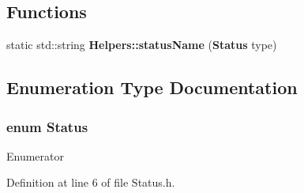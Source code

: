 \subsection*{Functions}
\begin{DoxyCompactItemize}
\item 
static std\+::string {\bf Helpers\+::status\+Name} ({\bf Status} type)
\end{DoxyCompactItemize}


\subsection{Enumeration Type Documentation}
\subsubsection[{Status}]{\setlength{\rightskip}{0pt plus 5cm}enum {\bf Status}\hspace{0.3cm}{\ttfamily [strong]}}\label{_status_8h_a67a0db04d321a74b7e7fcfd3f1a3f70b}
\begin{Desc}
\item[Enumerator]\par
\begin{description}
\item[{\em 
Moving\label{_status_8h_a67a0db04d321a74b7e7fcfd3f1a3f70badefe967ad0373b2274fc298f19125ca7}
}]\item[{\em 
Stopped\label{_status_8h_a67a0db04d321a74b7e7fcfd3f1a3f70bac23e2b09ebe6bf4cb5e2a9abe85c0be2}
}]\item[{\em 
Idle\label{_status_8h_a67a0db04d321a74b7e7fcfd3f1a3f70bae599161956d626eda4cb0a5ffb85271c}
}]\end{description}
\end{Desc}


Definition at line 6 of file Status.\+h.

